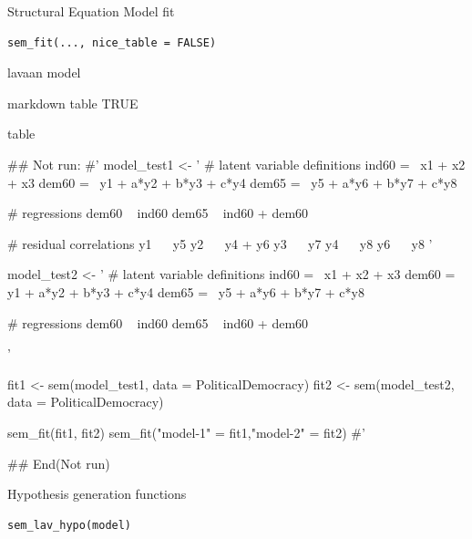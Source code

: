 \documentclass[a4paper]{book}
\begin{document}
%
\begin{Description}
Structural Equation Model fit
\end{Description}
%
\begin{Usage}
\begin{verbatim}
sem_fit(..., nice_table = FALSE)
\end{verbatim}
\end{Usage}
%
\begin{Arguments}
\begin{ldescription}
\item[\code{...}] lavaan model

\item[\code{nice\_table}] markdown table TRUE
\end{ldescription}
\end{Arguments}
%
\begin{Value}
table
\end{Value}
%
\begin{Examples}
\begin{ExampleCode}
## Not run: 
#'
model_test1 <- '
  # latent variable definitions
     ind60 =~ x1 + x2 + x3
     dem60 =~ y1 + a*y2 + b*y3 + c*y4
     dem65 =~ y5 + a*y6 + b*y7 + c*y8

  # regressions
    dem60 ~ ind60
    dem65 ~ ind60 + dem60

  # residual correlations
    y1 ~~ y5
    y2 ~~ y4 + y6
    y3 ~~ y7
    y4 ~~ y8
    y6 ~~ y8
'

model_test2 <- '
  # latent variable definitions
     ind60 =~ x1 + x2 + x3
     dem60 =~ y1 + a*y2 + b*y3 + c*y4
     dem65 =~ y5 + a*y6 + b*y7 + c*y8

  # regressions
    dem60 ~ ind60
    dem65 ~ ind60 + dem60

'

fit1 <- sem(model_test1, data = PoliticalDemocracy)
fit2 <- sem(model_test2, data = PoliticalDemocracy)

sem_fit(fit1, fit2)
sem_fit("model-1" = fit1,"model-2" = fit2)
#'

## End(Not run)
\end{ExampleCode}
\end{Examples}
%
\begin{Description}
Hypothesis generation functions
\end{Description}
%
\begin{Usage}
\begin{verbatim}
sem_lav_hypo(model)
\end{verbatim}
\end{Usage}
\end{document}
